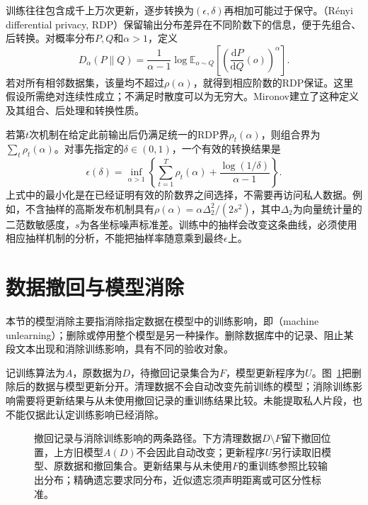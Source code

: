 训练往往包含成千上万次更新，逐步转换为$(\epsilon,\delta)$再相加可能过于保守。（Rényi differential privacy, RDP）保留输出分布差异在不同阶数下的信息，便于先组合、后转换。对概率分布$P,Q$和$\alpha>1$，定义
\begin{equation}
 D_\alpha(P\|Q)=\frac{1}{\alpha-1}
 \log\mathbb E_{o\sim Q}
 \left[\left(\frac{\mathrm dP}{\mathrm dQ}(o)\right)^\alpha\right].
 \label{eq:privacy-renyi}
\end{equation}
若对所有相邻数据集，该量均不超过$\rho(\alpha)$，就得到相应阶数的RDP保证。这里假设所需绝对连续性成立；不满足时散度可以为无穷大。Mironov建立了这种定义及其组合、后处理和转换性质。

若第$t$次机制在给定此前输出后仍满足统一的RDP界$\rho_t(\alpha)$，则组合界为$\sum_t\rho_t(\alpha)$。对事先指定的$\delta\in(0,1)$，一个有效的转换结果是
\begin{equation}
 \epsilon(\delta)=
 \inf_{\alpha>1}\left\{
 \sum_{t=1}^{T}\rho_t(\alpha)
 +\frac{\log(1/\delta)}{\alpha-1}
 \right\}.
 \label{eq:privacy-accounting}
\end{equation}
上式中的最小化是在已经证明有效的阶数界之间选择，不需要再访问私人数据。例如，不含抽样的高斯发布机制具有$\rho(\alpha)=\alpha\Delta_2^2/(2s^2)$，其中$\Delta_2$为向量统计量的二范数敏感度，$s$为各坐标噪声标准差。训练中的抽样会改变这条曲线，必须使用相应抽样机制的分析，不能把抽样率随意乘到最终$\epsilon$上。

\section{数据撤回与模型消除}
\label{sec:privacy-unlearning}

本节的模型消除主要指消除指定数据在模型中的训练影响，即（machine unlearning）；删除或停用整个模型是另一种操作。删除数据库中的记录、阻止某段文本出现和消除训练影响，具有不同的验收对象。

记训练算法为$A$，原数据为$D$，待撤回记录集合为$F$，模型更新程序为$U$。图~\ref{fig:trust-privacy-deletion}把删除后的数据与模型更新分开。清理数据不会自动改变先前训练的模型；消除训练影响需要将更新结果与从未使用撤回记录的重训练结果比较。未能提取私人片段，也不能仅据此认定训练影响已经消除。

\begin{figure}[htbp]
  \centering
  
  \caption{撤回记录与消除训练影响的两条路径。下方清理数据$D\setminus F$留下撤回位置，上方旧模型$A(D)$不会因此自动改变；更新程序$U$另行读取旧模型、原数据和撤回集合。更新结果与从未使用$F$的重训练参照比较输出分布；精确遗忘要求同分布，近似遗忘须声明距离或可区分性标准。}
  \label{fig:trust-privacy-deletion}
\end{figure}

